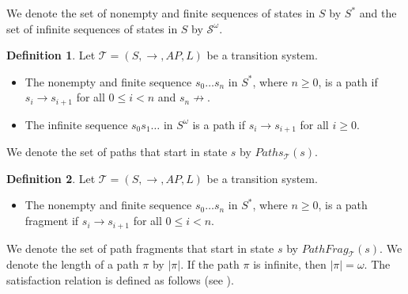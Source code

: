 \documentclass[12pt]{article}
\theoremstyle{definition}
\newtheorem{definition}{Definition}
\begin{document}
We denote the set of nonempty and finite sequences of states in $S$ by $S^*$ and the set of infinite sequences of states in $S$ by $\mathcal{S}^{\omega}$.

\begin{definition}
\label{definition:complete-path}
Let $\mathcal{T} = (S, \rightarrow, \mathit{AP}, L)$ be a transition system.
\begin{itemize}
\item 
The nonempty and finite sequence $s_0 \ldots s_n$ in $S^*$, where $n \geq 0$, is a path if $s_i \rightarrow s_{i+1}$ for all $0 \leq i < n$ and $s_n \not\rightarrow$.
\item 
The infinite sequence $s_0 s_1 \ldots$ in $S^{\omega}$ is a path if $s_i \rightarrow s_{i+1}$ for all $i \geq 0$. 
\end{itemize}
\end{definition}

We denote the set of paths that start in state $s$ by $\mathit{Paths}_{\mathcal{T}}(s)$.

\begin{definition}
\label{definition:partial-path}
Let $\mathcal{T} = (S, \rightarrow, \mathit{AP}, L)$ be a transition system.
\begin{itemize}
\item 
The nonempty and finite sequence $s_0 \ldots s_n$ in $S^*$, where $n \geq 0$, is a path fragment if $s_i \rightarrow s_{i+1}$ for all $0 \leq i < n$.
\end{itemize}
\end{definition}

We denote the set of path fragments that start in state $s$ by $\mathit{PathFrag}_{\mathcal{T}}(s)$.  We denote the length of a path $\pi$ by $|\pi|$.  If the path $\pi$ is infinite, then $|\pi| = \omega$.  The satisfaction relation is defined as follows (see \cite[Remark~6.11]{BK08}).
\end{document}
